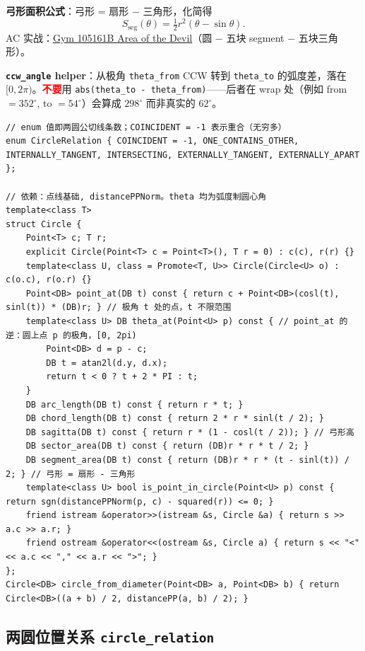 		\textbf{弓形面积公式}：弓形 = 扇形 $-$ 三角形，化简得
		$$S_{\text{seg}}(\theta) = \tfrac{1}{2} r^2 (\theta - \sin \theta).$$
		AC 实战：\href{https://vjudge.net/problem/Gym-105161B}{Gym 105161B Area of the Devil}（圆 $-$ 五块 segment $-$ 五块三角形）。

		\textbf{\texttt{ccw\_angle} helper}：从极角 \texttt{theta\_from} CCW 转到 \texttt{theta\_to} 的弧度差，落在 $[0, 2\pi)$。\textcolor{red}{\textbf{不要}}用 \texttt{abs(theta\_to - theta\_from)}——后者在 wrap 处（例如 from $= 352^{\circ}$, to $= 54^{\circ}$）会算成 $298^{\circ}$ 而非真实的 $62^{\circ}$。

\begin{verbatim}
// enum 值即两圆公切线条数；COINCIDENT = -1 表示重合（无穷多）
enum CircleRelation { COINCIDENT = -1, ONE_CONTAINS_OTHER, INTERNALLY_TANGENT, INTERSECTING, EXTERNALLY_TANGENT, EXTERNALLY_APART };

// 依赖：点线基础, distancePPNorm。theta 均为弧度制圆心角
template<class T>
struct Circle {
	Point<T> c; T r;
	explicit Circle(Point<T> c = Point<T>(), T r = 0) : c(c), r(r) {}
	template<class U, class = Promote<T, U>> Circle(Circle<U> o) : c(o.c), r(o.r) {}
	Point<DB> point_at(DB t) const { return c + Point<DB>(cosl(t), sinl(t)) * (DB)r; } // 极角 t 处的点，t 不限范围
	template<class U> DB theta_at(Point<U> p) const { // point_at 的逆：圆上点 p 的极角，[0, 2pi)
		Point<DB> d = p - c;
		DB t = atan2l(d.y, d.x);
		return t < 0 ? t + 2 * PI : t;
	}
	DB arc_length(DB t) const { return r * t; }
	DB chord_length(DB t) const { return 2 * r * sinl(t / 2); }
	DB sagitta(DB t) const { return r * (1 - cosl(t / 2)); } // 弓形高
	DB sector_area(DB t) const { return (DB)r * r * t / 2; }
	DB segment_area(DB t) const { return (DB)r * r * (t - sinl(t)) / 2; } // 弓形 = 扇形 - 三角形
	template<class U> bool is_point_in_circle(Point<U> p) const { return sgn(distancePPNorm(p, c) - squared(r)) <= 0; }
	friend istream &operator>>(istream &s, Circle &a) { return s >> a.c >> a.r; }
	friend ostream &operator<<(ostream &s, Circle a) { return s << "<" << a.c << "," << a.r << ">"; }
};
Circle<DB> circle_from_diameter(Point<DB> a, Point<DB> b) { return Circle<DB>((a + b) / 2, distancePP(a, b) / 2); }
\end{verbatim}

		\subsection{两圆位置关系 \texttt{circle\_relation}}

